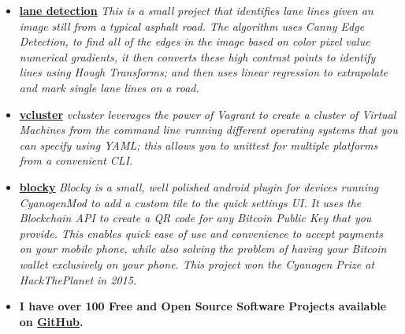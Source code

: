 \documentclass[12pt,a4paper,sans]{moderncv}
\begin{document}
\begin{itemize}



\item{\textbf{\href{https://github.com/davidawad/lane-detection}{lane detection}}\textit{ This is a small project that identifies lane lines given an image still from a typical asphalt road. The algorithm uses Canny Edge Detection, to find all of the edges in the image based on color pixel value numerical gradients, it then converts these high contrast points to identify lines using Hough Transforms; and then uses linear regression to extrapolate and mark single lane lines on a road.}}


\item{\textbf{\href{https://github.com/davidawad/vcluster}{vcluster}}\textit{ vcluster leverages the power of Vagrant to create a cluster of Virtual Machines from the command line running different operating systems that you can specify using YAML; this allows you to unittest for multiple platforms from a convenient CLI.}}
\vspace{5pt}

\iffalse 
\item{\textbf{\href{http://github.com/davidawad/Quantum-Simulator}{Quantum Simulator}} \textit{ I currently maintain a quantum computation simulator written in python to replicate the effects of quantum logical gates on quantum bits in order to asses changes in amplitudes and experiment on quantum algorithms.}}
\vspace{5pt}

\item{\textbf{\href{http://insightweets.mybluemix.net/landing}{Insightweets}}\textit{ Insightweets is an app meant to gather insights about specific kinds of people in any geographic location using Twitter and machine learning. It queries Twitter for location based data and then processes it using machine learning. Built using NodeJS, Express, Jade, LESS, and the Twitter API. This project won the IBM Bluemix prize at HackNY in 2015.}}
\vspace{5pt}
\fi %


\item{\textbf{\href{http://github.com/davidawad/blocky}{blocky}} \textit{ 
Blocky is a small, well polished android plugin for devices running CyanogenMod to add a custom tile to the quick settings UI. It uses the Blockchain API to create a QR code for any Bitcoin Public Key that you provide. This enables quick ease of use and convenience to accept payments on your mobile phone, while also solving the problem of having your Bitcoin wallet exclusively on your phone. This project won the Cyanogen Prize at HackThePlanet in 2015.
}}

\vspace{5pt}

\item{\textbf{I have over 100 Free and Open Source Software Projects available on \href{https://github.com/davidawad}{GitHub}.}}

\end{itemize}
\end{document}

